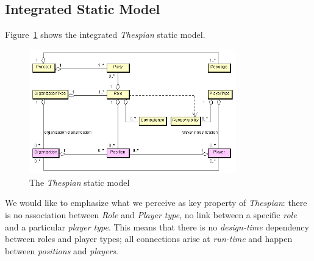 \subsection{Integrated Static Model}

Figure~\ref{figure:thespian-integrated-metamodel} shows the integrated \textit{Thespian} static model.

\begin{figure}[ht]
	\centering
	\includegraphics[width=0.8\textwidth]{images/thespian/thespian-metamodel}
	\caption{The \textit{Thespian} static model}
	\label{figure:thespian-integrated-metamodel}
\end{figure}

We would like to emphasize what we perceive as key property of \textit{Thespian}: there is no association between \textit{Role} and \textit{Player type}, no link between a specific \textit{role} and a particular \textit{player type}.
This means that there is no \textit{design-time} dependency between roles and player types; all connections arise at \textit{run-time} and happen between \textit{positions} and \textit{players}.